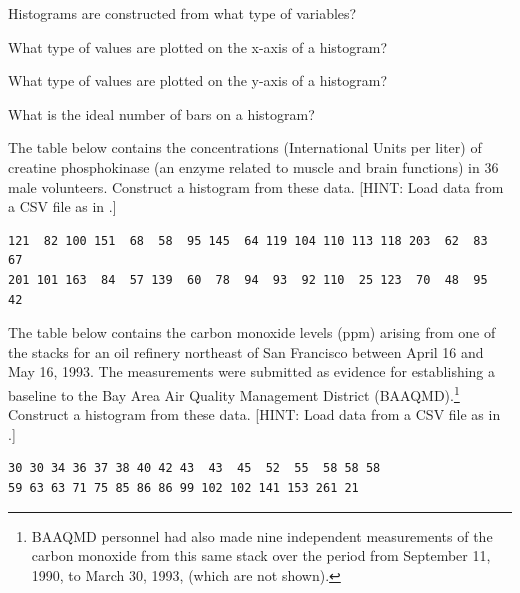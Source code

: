 \documentclass[10pt,openany]{book}\usepackage[]{graphicx}\usepackage[]{color}
\begin{document}
\begin{exsection}
  \item \label{revex:quEDAHistVar} Histograms are constructed from what type of variables? 
  \item \label{revex:quEDAHistX} What type of values are plotted on the x-axis of a histogram? 
  \item \label{revex:quEDAHistY} What type of values are plotted on the y-axis of a histogram? 
  \item \label{revex:quEDAHistBins} What is the ideal number of bars on a histogram? 
  \item \label{revex:quEDACreatPhosph} \rhw{} The table below contains the concentrations (International Units per liter) of creatine phosphokinase (an enzyme related to muscle and brain functions) in 36 male volunteers.  Construct a histogram from these data.  [HINT: Load data from a CSV file as in .]
    \begin{Verbatim}[xleftmargin=5mm]
121  82 100 151  68  58  95 145  64 119 104 110 113 118 203  62  83  67
201 101 163  84  57 139  60  78  94  93  92 110  25 123  70  48  95  42
    \end{Verbatim}
  \item \label{revex:quEDAAirPolln} \rhw{} The table below contains the carbon monoxide levels (ppm) arising from one of the stacks for an oil refinery northeast of San Francisco between April 16 and May 16, 1993. The measurements were submitted as evidence for establishing a baseline to the Bay Area Air Quality Management District (BAAQMD).\footnote{BAAQMD personnel had also made nine independent measurements of the carbon monoxide from this same stack over the period from September 11, 1990, to March 30, 1993, (which are not shown).}  Construct a histogram from these data.  [HINT: Load data from a CSV file as in .]
    \begin{Verbatim}[xleftmargin=5mm]
30 30 34 36 37 38 40 42 43  43  45  52  55  58 58 58
59 63 63 71 75 85 86 86 99 102 102 141 153 261 21
    \end{Verbatim}
\end{exsection}

\vspace{-24pt}
\end{document}
